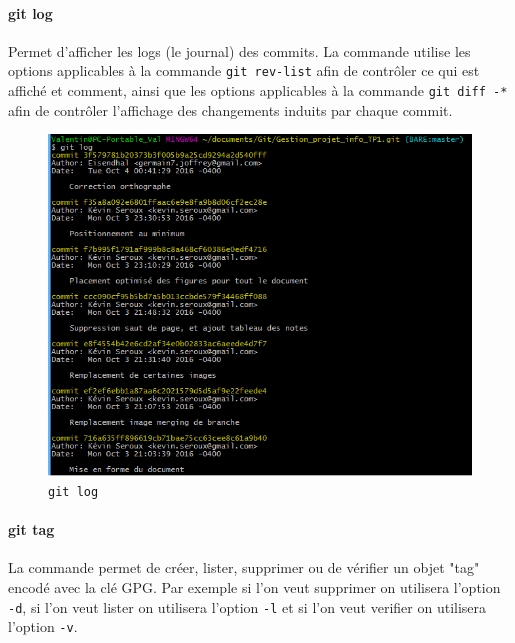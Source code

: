 \documentclass[11pt,canadien]{article}
\begin{document}
\paragraph{git log}Permet d'afficher les logs (le journal) des commits. La commande utilise les options applicables à la commande \texttt{git rev-list} afin de contrôler ce qui est affiché et comment, ainsi que les options applicables à la commande \texttt{git diff -*} afin de contrôler l'affichage des changements induits par chaque commit.
\begin{figure}[h]
	\centering
	\includegraphics[width=\textwidth]{images/git log.png}
	\caption{\texttt{git log}}
	\label{fig:git_log}
\end{figure}

\paragraph{git tag}La commande permet de créer, lister, supprimer ou de vérifier un objet "tag" encodé avec la clé GPG. Par exemple si l'on veut supprimer on utilisera  l'option \texttt{-d}, si l'on veut lister on utilisera l'option \texttt{-l} et si l'on veut verifier on utilisera l'option \texttt{-v}.
\end{document}
